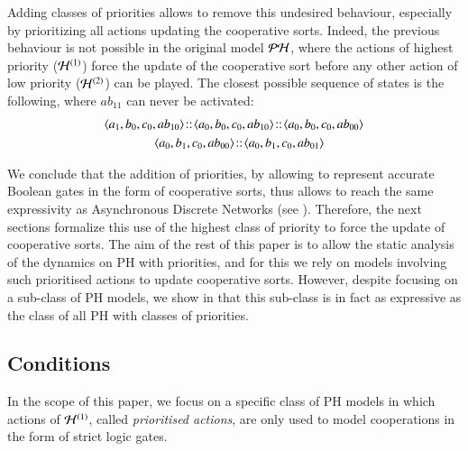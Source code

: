 Adding classes of priorities allows to remove this undesired behaviour,
especially by prioritizing all actions updating the cooperative sorts.
Indeed, the previous behaviour is not possible in the original model $\mathcal{PH}$,
where the actions of highest priority ($\mathcal{H}^{(1)}$)
force the update of the cooperative sort before any other action of
low priority ($\mathcal{H}^{(2)}$) can be played.
The closest possible sequence of states is the following,
where $ab_{11}$ can never be activated:
\begin{align*}
  & \mbox{$\langle a_1, b_0, c_0, ab_{10} \rangle$} \!::\!
    \mbox{$\langle a_0, b_0, c_0, ab_{10} \rangle$} \!::\!
    \mbox{$\langle a_0, b_0, c_0, ab_{00} \rangle$} \\
  & \qquad\qquad
    \mbox{$\langle a_0, b_1, c_0, ab_{00} \rangle$} \!::\!
    \mbox{$\langle a_0, b_1, c_0, ab_{01} \rangle$}
\end{align*}

We conclude that the addition of priorities,
by allowing to represent accurate Boolean gates in the form of cooperative sorts,
thus allows to reach the same expressivity as Asynchronous Discrete Networks
(see ).
Therefore, the next sections 
formalize this use of the highest class of priority
to force the update of cooperative sorts.
The aim of the rest of this paper is to allow the static analysis
of the dynamics on PH with priorities,
and for this we rely on models involving
such prioritised actions to update cooperative sorts.
However, despite focusing on a sub-class of PH models,
we show in 
that this sub-class is in fact as expressive as the class
of all PH with classes of priorities.



\subsection{Conditions}
\label{ssec:hypothesis}

In the scope of this paper, we focus on a specific class of PH models
in which actions of $\mathcal{H}^{(1)}$, called \emph{prioritised actions},
are only used to model cooperations in the form of strict logic gates.
%


